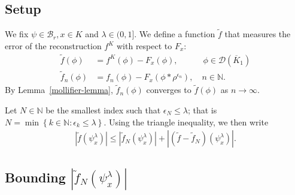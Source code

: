 \subsection*{Setup} 

We fix \(\psi \in \mathcal{B}_r, x \in K\) and \(\lambda \in (0,1]\). We define a function \(\tilde f\) that measures the error of the reconstruction \(f^K\) with respect to \(F_x\):  
\begin{align*}
    \tilde f(\phi) &= f^K(\phi) - F_x(\phi), \quad \qquad \phi \in \mathcal{D}(\overline{K}_1)\\
    \tilde f_n(\phi) &= f_n(\phi) - F_x(\phi * \rho^{\epsilon_n}), \quad n \in \mathbb{N}.
\end{align*}
By Lemma~\ref{mollifier-lemma}, \(\tilde f_n(\phi)\) converges to \(\tilde f(\phi)\) as \(n \to \infty\).

Let \(N \in \mathbb{N}\) be the smallest index such that \(\epsilon_N \leq \lambda\); that is \(N = \min \left\{ k \in \mathbb{N} : \epsilon_k \leq \lambda  \right\}\). Using the triangle inequality, we then write 
\begin{align*}
    |\tilde f (\psi^\lambda_x)| \leq  |\tilde f_N (\psi^\lambda_x)| + |(\tilde f - \tilde f_N) (\psi^\lambda_x)|.
\end{align*}

\subsection*{Bounding \(|\tilde f_N (\psi^\lambda_x)|\)} 


